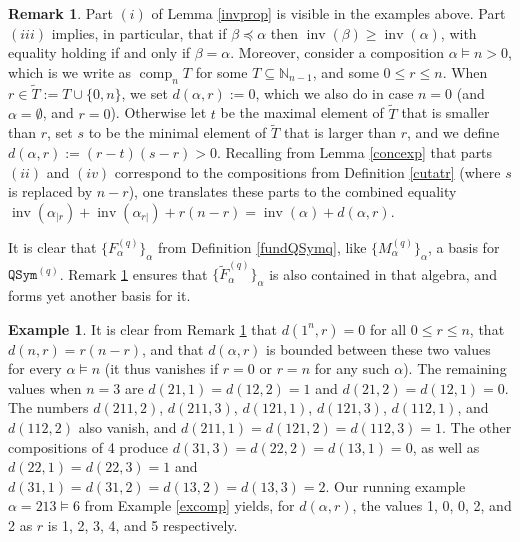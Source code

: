 \documentclass{article}
\theoremstyle{definition}
\newtheorem{rmk}[thm]{Remark}
\newtheorem{ex}[thm]{Example}
\begin{document}
\begin{rmk}
Part $(i)$ of Lemma \ref{invprop} is visible in the examples above. Part $(iii)$ implies, in particular, that if $\beta\preceq\alpha$ then $\operatorname{inv}(\beta)\geq\operatorname{inv}(\alpha)$, with equality holding if and only if $\beta=\alpha$. Moreover, consider a composition $\alpha \vDash n>0$, which is we write as $\operatorname{comp}_{n}T$ for some $T\subseteq\mathbb{N}_{n-1}$, and some $0 \leq r \leq n$. When $r\in\tilde{T}:=T\cup\{0,n\}$, we set $d(\alpha,r):=0$, which we also do in case $n=0$ (and $\alpha=\emptyset$, and $r=0$). Otherwise let $t$ be the maximal element of $\tilde{T}$ that is smaller than $r$, set $s$ to be the minimal element of $\tilde{T}$ that is larger than $r$, and we define $d(\alpha,r):=(r-t)(s-r)>0$. Recalling from Lemma \ref{concexp} that parts $(ii)$ and $(iv)$ correspond to the compositions from Definition \ref{cutatr} (where $s$ is replaced by $n-r$), one translates these parts to the combined equality $\operatorname{inv}(\alpha_{|r})+\operatorname{inv}(\alpha_{r|})+r(n-r)=\operatorname{inv}(\alpha)+d(\alpha,r)$. \label{invineq}
\end{rmk}
It is clear that $\{F_{\alpha}^{(q)}\}_{\alpha}$ from Definition \ref{fundQSymq}, like $\{M_{\alpha}^{(q)}\}_{\alpha}$, a basis for $\mathtt{QSym}^{(q)}$. Remark \ref{invineq} ensures that $\{\widetilde{F}_{\alpha}^{(q)}\}_{\alpha}$ is also contained in that algebra, and forms yet another basis for it.
\begin{ex}
It is clear from Remark \ref{invineq} that $d(1^{n},r)=0$ for all $0 \leq r \leq n$, that $d(n,r)=r(n-r)$, and that $d(\alpha,r)$ is bounded between these two values for every $\alpha \vDash n$ (it thus vanishes if $r=0$ or $r=n$ for any such $\alpha$). The remaining values when $n=3$ are $d(21,1)=d(12,2)=1$ and $d(21,2)=d(12,1)=0$. The numbers $d(211,2)$, $d(211,3)$, $d(121,1)$, $d(121,3)$, $d(112,1)$, and $d(112,2)$ also vanish, and $d(211,1)=d(121,2)=d(112,3)=1$. The other compositions of 4 produce $d(31,3)=d(22,2)=d(13,1)=0$, as well as $d(22,1)=d(22,3)=1$ and $d(31,1)=d(31,2)=d(13,2)=d(13,3)=2$. Our running example $\alpha=213\vDash6$ from Example \ref{excomp} yields, for $d(\alpha,r)$, the values 1, 0, 0, 2, and 2 as $r$ is 1, 2, 3, 4, and 5 respectively. \label{dalpharex}
\end{ex}

\medskip
\end{document}
